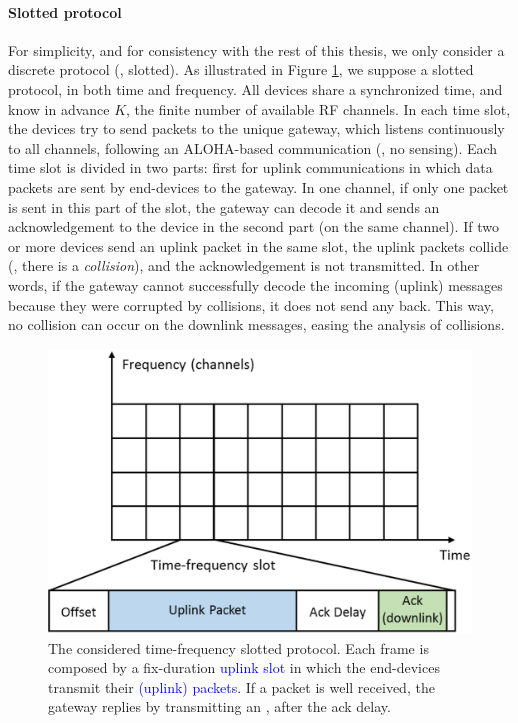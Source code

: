 \paragraph{Slotted protocol}
%
For simplicity, and for consistency with the rest of this thesis, we only consider a discrete protocol (\ie, slotted).
As illustrated in Figure \ref{fig:41:protocol}, we suppose a slotted protocol, in both time and frequency.
All devices share a synchronized time, and know in advance $K$, the finite number of available RF channels.
In each time slot, the devices try to send packets to the unique gateway, which listens continuously to all channels, following an ALOHA-based communication (\ie, no sensing).
Each time slot is divided in two parts: first for uplink communications in which data packets are sent by end-devices to the gateway.
In one channel, if only one packet is sent in this part of the slot, the gateway can decode it and sends an acknowledgement to the device in the second part (on the same channel).
If two or more devices send an uplink packet in the same slot, the uplink packets collide (\ie, there is a \emph{collision}), and the acknowledgement \Ack{} is not transmitted.
In other words, if the gateway cannot successfully decode the incoming (uplink) messages because they were corrupted by collisions, it does not send any \Ack{} back.
This way, no collision can occur on the downlink messages, easing the analysis of collisions.

\begin{figure}[!t]
    \centering
    \includegraphics[scale=0.40]{protocol.eps}
    \caption{The considered time-frequency slotted protocol. Each frame is composed by a fix-duration \textcolor{blue}{uplink slot} in which the end-devices transmit their \textcolor{blue}{(uplink) packets}. If a packet is well received, the gateway replies by transmitting an \textcolor{darkgreen}{\Ack}, after the ack delay.}
    \label{fig:41:protocol}
\end{figure}


